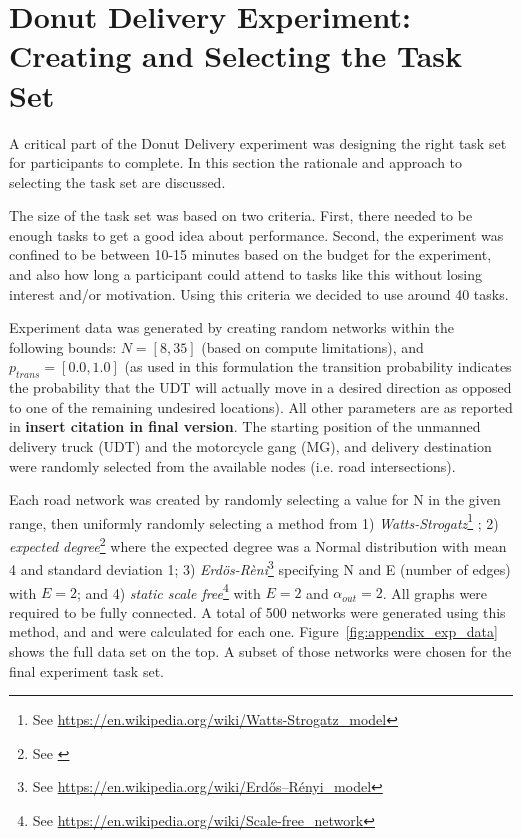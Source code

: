 \section{Donut Delivery Experiment: Creating and Selecting the Task Set} \label{sec:task_set}
A critical part of the Donut Delivery experiment was designing the right task set for participants to complete. In this section the rationale and approach to selecting the task set are discussed.

The size of the task set was based on two criteria. First, there needed to be enough tasks to get a good idea about performance. Second, the experiment was confined to be between 10-15 minutes based on the budget for the experiment, and also how long a participant could attend to tasks like this without losing interest and/or motivation. Using this criteria we decided to use around 40 tasks.

Experiment data was generated by creating random networks within the following bounds: $N = [8,35]$ (based on compute limitations), and $p_{trans}=[0.0,1.0]$ (as used in this formulation the transition probability indicates the probability that the UDT will actually move in a desired direction as opposed to one of the remaining undesired locations). All other parameters are as reported in \textbf{insert citation in final version}. The starting position of the unmanned delivery truck (UDT) and the motorcycle gang (MG), and delivery destination were randomly selected from the available nodes (i.e. road intersections).

Each road network was created by randomly selecting a value for N in the given range, then uniformly randomly selecting a method from 1) \emph{Watts-Strogatz}\footnote{See \url{https://en.wikipedia.org/wiki/Watts-Strogatz_model}} ; 2) \emph{expected degree}\footnote{See \cite{Chung2002-jh}} where the expected degree was a Normal distribution with mean 4 and standard deviation 1; 3) \emph{Erd\"{o}s-R\`{e}ni}\footnote{See \url{https://en.wikipedia.org/wiki/Erdős–Rényi_model}} specifying N and E (number of edges) with $E = 2$; and 4) \emph{static scale free}\footnote{See \url{https://en.wikipedia.org/wiki/Scale-free_network}} with $E = 2$ and $\alpha_{out}=2$. All graphs were required to be fully connected. A total of 500 networks were generated using this method, and \xQ{} and \xO{} were calculated for each one. Figure~\ref{fig:appendix_exp_data} shows the full data set on the top. A subset of those networks were chosen for the final experiment task set.

